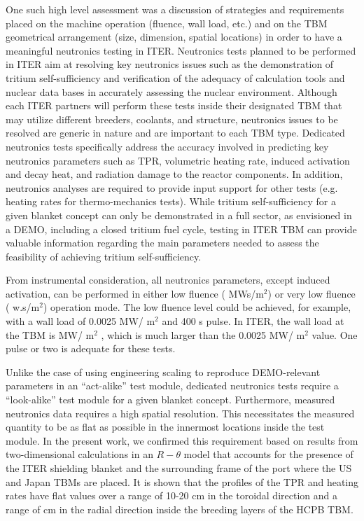 One such high level assessment was a discussion of strategies and requirements
placed on the machine operation (fluence, wall load, etc.) and on the
\gls{TBM} geometrical arrangement (size, dimension, spatial locations) in
order to have a meaningful neutronics testing in ITER.  Neutronics tests
planned to be performed in ITER aim at resolving key neutronics issues such as
the demonstration of tritium self-sufficiency and verification of the adequacy
of calculation tools and nuclear data bases in accurately assessing the
nuclear environment.  Although each ITER partners will perform these tests
inside their designated \gls{TBM} that may utilize different breeders,
coolants, and structure, neutronics issues to be resolved are generic in
nature and are important to each TBM type. Dedicated neutronics tests
specifically address the accuracy involved in predicting key neutronics
parameters such as \gls{TPR}, volumetric heating rate, induced activation and
decay heat, and radiation damage to the reactor components. In addition,
neutronics analyses are required to provide input support for other tests
(e.g.  heating rates for thermo-mechanics tests). While tritium
self-sufficiency for a given blanket concept can only be demonstrated in a
full sector, as envisioned in a DEMO, including a closed tritium fuel cycle,
testing in ITER TBM can provide valuable information regarding the main
parameters needed to assess the feasibility of achieving tritium
self-sufficiency.

From instrumental consideration, all neutronics parameters, except induced
activation, can be performed in either low fluence ( MWs/m$^2$)
or very low fluence ( w.s/m$^2$) operation mode. The low fluence
level could be achieved, for example, with a wall load of 0.0025 MW/ m$^2$ and
400 s pulse. In ITER, the wall load at the \gls{TBM} is  MW/
m$^2$ , which is much larger than the 0.0025 MW/ m$^2$ value. One pulse or two
is adequate for these tests.

Unlike the case of using engineering scaling to reproduce DEMO-relevant
parameters in an “act-alike” test module, dedicated neutronics tests require a
“look-alike” test module for a given blanket concept. Furthermore, measured
neutronics data requires a high spatial resolution. This necessitates the
measured quantity to be as flat as possible in the innermost locations inside
the test module. In the present work, we confirmed this requirement based on
results from two-dimensional calculations in an $R-\theta$ model that accounts
for the presence of the ITER shielding blanket and the surrounding frame of
the port where the US and Japan \gls{TBM}s are placed. It is shown that the
profiles of the \gls{TPR} and heating rates have flat values over a range of
10-20 cm in the toroidal direction and a range of  cm in the
radial direction inside the breeding layers of the \gls{HCPB}
\gls{TBM}. 


